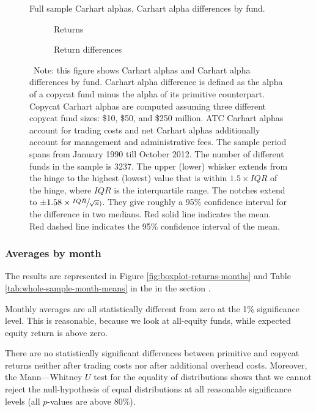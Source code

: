 \documentclass[12pt, a4]{article}
\begin{document}
\begin{figure}
	\centering
	\caption{Full sample Carhart alphas, Carhart alpha differences by fund.}
	\label{fig:boxplot-alphas-funds}
	\begin{subfigure}[t]{\linewidth}
		
		\caption{Returns}
		\label{fig:boxplot-alphas-funds-return}
	\end{subfigure}
	
	\begin{subfigure}[b]{\linewidth}
		
		\caption{Return differences}
		\label{fig:boxplot-alphas-funds-diff}	
	\end{subfigure}
	\caption*{\scriptsize ~Note: this figure shows Carhart alphas and Carhart alpha differences by fund. Carhart alpha difference is defined as the alpha of a copycat fund minus the alpha of its primitive counterpart. Copycat Carhart alphas are computed assuming three different copycat fund sizes: \$10, \$50, and \$250 million. \textsc{ATC} Carhart alphas account for trading costs and net Carhart alphas additionally account for management and administrative fees. The sample period spans from January 1990 till October 2012. The number of different funds in the sample is 3237. The upper (lower) whisker extends from the hinge to the highest (lowest) value that is within $1.5 \times IQR$ of the hinge, where $IQR$ is the interquartile range. The notches extend to $\pm 1.58 \times \sfrac{IQR}{\sqrt{n})}$. They give roughly a 95\% confidence interval for the difference in two medians. Red solid line indicates the mean. Red dashed line indicates the 95\% confidence interval of the mean. }
\end{figure}

\subsubsection{Averages by month}

The results are represented in Figure \ref{fig:boxplot-returns-months} and Table \ref{tab:whole-sample-month-means} in the  in the section . 

Monthly averages are all statistically different from zero at the 1\% significance level. This is reasonable, because we look at all-equity funds, while expected equity return is above zero. 

There are no statistically significant differences between primitive and copycat returns neither after trading costs nor after additional overhead costs. Moreover, the Mann---Whitney $U$ test for the equality of distributions shows that we cannot reject the null-hypothesis of equal distributions at all reasonable significance levels (all $p$-values are above 80\%).
\end{document}
